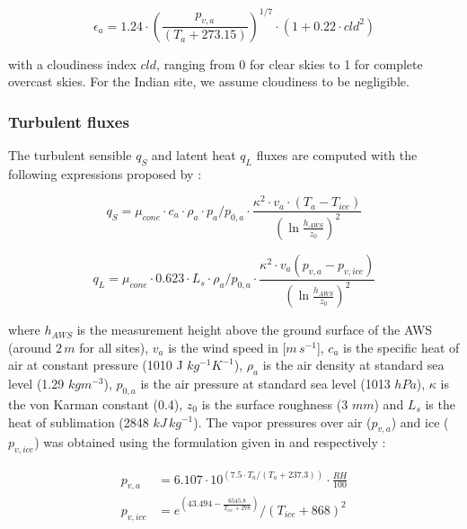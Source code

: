 \documentclass[utf8]{frontiersSCNS}
\begin{document}
\begin{equation}
	\epsilon_a=1.24 \cdot (\frac{p_{v,a}}{(T_a+273.15)})^{1/7}\cdot(1+0.22\cdot{cld}^2) \label{eqn:atm_e}
\end{equation}

with a cloudiness index $cld$, ranging from 0 for clear skies to 1 for complete overcast skies. For the Indian
site, we assume cloudiness to be negligible.

\subsubsection{Turbulent fluxes} \label{sec:Qs}

The turbulent sensible $q_{S}$ and latent heat $q_{L}$ fluxes are computed with the following expressions
proposed by \cite{Garratt_1992}:

\begin{equation}
	q_{S}=\mu_{cone}\cdot c_{a} \cdot \rho_{a} \cdot p_{a}/p_{0,a} \cdot \frac{\kappa^2 \cdot v_a \cdot
		(T_a-T_{ice})}{{(\ln{\frac{h_{AWS}}{z_{0}}})}^2}
	\label{eqn:qs}
\end{equation}

\begin{equation}
	q_{L}=\mu_{cone}\cdot 0.623 \cdot L_s \cdot \rho_{a}/p_{0,a} \cdot \frac{\kappa^2 \cdot
	v_a(p_{v,a}-p_{v,ice})}{{(\ln{\frac{h_{AWS}}{z_{0}}})}^2}
\end{equation}

where $h_{AWS}$ is the measurement height above the ground surface of the AWS (around $2\,m$ for all sites),
$v_a$ is the wind speed in [$m\,s^{-1}$], $c_a$ is the specific heat of air at constant pressure (1010 J
$kg^{-1} K^{-1}$), $\rho_{a}$ is the air density at standard sea level (1.29 $kg m^{-3}$), $p_{0,a}$ is the air
pressure at standard sea level (1013 $hPa$), $\kappa$ is the von Karman constant (0.4), $z_{0}$ is the surface
roughness (3 $mm$) and $L_s$ is the heat of sublimation (2848 $kJ\,kg^{-1}$).  The vapor pressures over air
($p_{v,a}$) and ice ($p_{v,ice}$) was obtained using the formulation given in \cite{WMO_2018} and
\cite{huang_2018} respectively  :

\begin{equation}
	\begin{split}
		p_{v,a}&=6.107 \cdot 10^{(7.5 \cdot T_a / (T_a + 237.3))} \cdot \frac{RH}{100}\\
		p_{v,ice}&=e^{(43.494 - \frac{6545.8}{T_{ice} + 278})}/(T_{ice} + 868)^2
	\end{split} \label{eqn:vp}
\end{equation}
\end{document}
